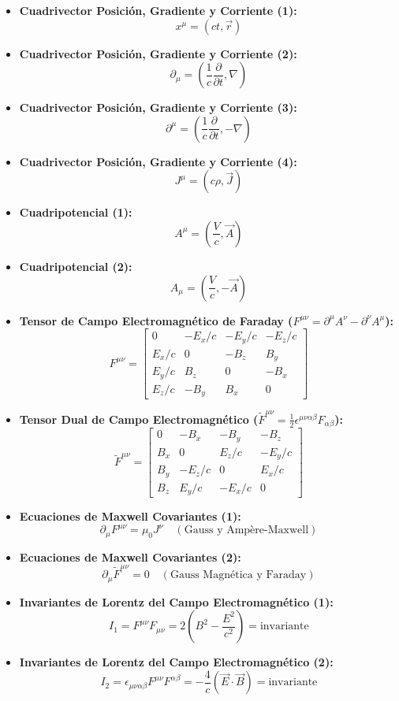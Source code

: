 \documentclass[11pt,a4paper]{article}
\begin{document}
\begin{itemize}
  \item \textbf{Cuadrivector Posición, Gradiente y Corriente (1):}
  \[
    x^\mu = (ct, \vec{r})
  \]
  \item \textbf{Cuadrivector Posición, Gradiente y Corriente (2):}
  \[
    \partial_\mu = \left( \frac{1}{c}\frac{\partial}{\partial t}, \nabla \right)
  \]
  \item \textbf{Cuadrivector Posición, Gradiente y Corriente (3):}
  \[
    \partial^\mu = \left( \frac{1}{c}\frac{\partial}{\partial t}, -\nabla \right)
  \]
  \item \textbf{Cuadrivector Posición, Gradiente y Corriente (4):}
  \[
    J^\mu = (c\rho, \vec{J})
  \]
  \item \textbf{Cuadripotencial (1):}
  \[
    A^\mu = \left( \frac{V}{c}, \vec{A} \right)
  \]
  \item \textbf{Cuadripotencial (2):}
  \[
    A_\mu = \left( \frac{V}{c}, -\vec{A} \right)
  \]
  \item \textbf{Tensor de Campo Electromagnético de Faraday ($F^{\mu\nu} = \partial^\mu A^\nu - \partial^\nu A^\mu$):}
  \[
    F^{\mu\nu} = \begin{bmatrix} 0 & -E_x/c & -E_y/c & -E_z/c \\ E_x/c & 0 & -B_z & B_y \\ E_y/c & B_z & 0 & -B_x \\ E_z/c & -B_y & B_x & 0 \end{bmatrix}
  \]
  \item \textbf{Tensor Dual de Campo Electromagnético ($\tilde{F}^{\mu\nu} = \frac{1}{2} \epsilon^{\mu\nu\alpha\beta} F_{\alpha\beta}$):}
  \[
    \tilde{F}^{\mu\nu} = \begin{bmatrix} 0 & -B_x & -B_y & -B_z \\ B_x & 0 & E_z/c & -E_y/c \\ B_y & -E_z/c & 0 & E_x/c \\ B_z & E_y/c & -E_x/c & 0 \end{bmatrix}
  \]
  \item \textbf{Ecuaciones de Maxwell Covariantes (1):}
  \[
    \partial_\mu F^{\mu\nu} = \mu_0 J^\nu \quad (\text{Gauss y Ampère-Maxwell})
  \]
  \item \textbf{Ecuaciones de Maxwell Covariantes (2):}
  \[
    \partial_\mu \tilde{F}^{\mu\nu} = 0 \quad (\text{Gauss Magnética y Faraday})
  \]
  \item \textbf{Invariantes de Lorentz del Campo Electromagnético (1):}
  \[
    I_1 = F^{\mu\nu} F_{\mu\nu} = 2 \left( B^2 - \frac{E^2}{c^2} \right) = \text{invariante}
  \]
  \item \textbf{Invariantes de Lorentz del Campo Electromagnético (2):}
  \[
    I_2 = \epsilon_{\mu\nu\alpha\beta} F^{\mu\nu} F^{\alpha\beta} = -\frac{4}{c} (\vec{E} \cdot \vec{B}) = \text{invariante}
  \]
\end{itemize}
\end{document}
